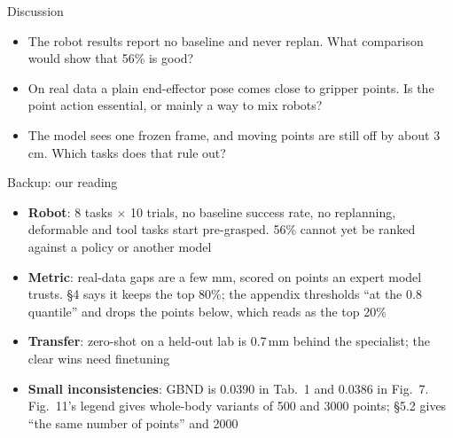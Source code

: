 \documentclass[aspectratio=169,12pt]{beamer}
\begin{document}
\begin{frame}{Discussion}
  \begin{itemize}\setlength{\itemsep}{6pt}
    \item The robot results report no baseline and never replan. What comparison would
      show that 56\% is good?
    \item On real data a plain end-effector pose comes close to gripper points. Is the
      point action essential, or mainly a way to mix robots?
    \item The model sees one frozen frame, and moving points are still off by about
      3\,cm. Which tasks does that rule out?
  \end{itemize}
\end{frame}

\appendix

\begin{frame}{Backup: our reading}
  \footnotesize
  \begin{itemize}\setlength{\itemsep}{5pt}
    \item \textbf{Robot}: 8 tasks $\times$ 10 trials, no baseline success rate, no
      replanning, deformable and tool tasks start pre-grasped. 56\% cannot yet be ranked
      against a policy or another model
    \item \textbf{Metric}: real-data gaps are a few mm, scored on points an expert model
      trusts. \S4 says it keeps the top 80\%; the appendix thresholds ``at the 0.8
      quantile'' and drops the points below, which reads as the top 20\%
    \item \textbf{Transfer}: zero-shot on a held-out lab is 0.7\,mm behind the specialist;
      the clear wins need finetuning
    \item \textbf{Small inconsistencies}: GBND is 0.0390 in Tab.~1 and 0.0386 in Fig.~7.
      Fig.~11's legend gives whole-body variants of 500 and 3000 points; \S5.2 gives ``the
      same number of points'' and 2000
  \end{itemize}
\end{frame}
\end{document}
